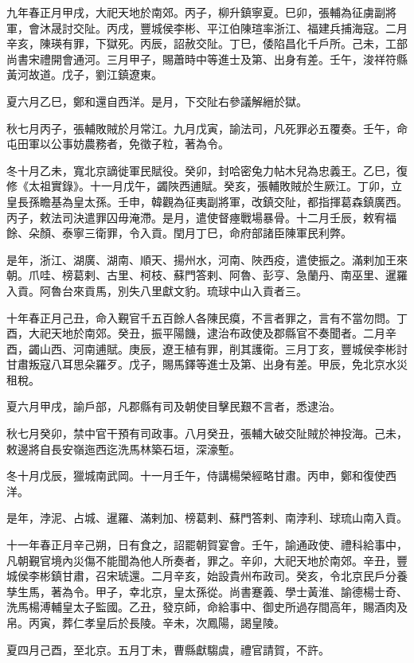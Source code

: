 \begin{pinyinscope}
九年春正月甲戌，大祀天地於南郊。丙子，柳升鎮寧夏。巳卯，張輔為征虜副將軍，會沐晟討交阯。丙戌，豐城侯李彬、平江伯陳瑄率浙江、福建兵捕海寇。二月辛亥，陳瑛有罪，下獄死。丙辰，詔赦交阯。丁巳，倭陷昌化千戶所。己未，工部尚書宋禮開會通河。三月甲子，賜蕭時中等進士及第、出身有差。壬午，浚祥符縣黃河故道。戊子，劉江鎮遼東。

夏六月乙巳，鄭和還自西洋。是月，下交阯右參議解縉於獄。

秋七月丙子，張輔敗賊於月常江。九月戊寅，諭法司，凡死罪必五覆奏。壬午，命屯田軍以公事妨農務者，免徵子粒，著為令。

冬十月乙未，寬北京謫徙軍民賦役。癸卯，封哈密兔力帖木兒為忠義王。乙巳，復修《太祖實錄》。十一月戊午，蠲陜西逋賦。癸亥，張輔敗賊於生厥江。丁卯，立皇長孫瞻基為皇太孫。壬申，韓觀為征夷副將軍，改鎮交阯，都指揮葛森鎮廣西。丙子，敕法司決遣罪囚毋淹滯。是月，遣使督瘞戰場暴骨。十二月壬辰，敕宥福餘、朵顏、泰寧三衛罪，令入貢。閏月丁巳，命府部諸臣陳軍民利弊。

是年，浙江、湖廣、湖南、順天、揚州水，河南、陜西疫，遣使振之。滿剌加王來朝。爪哇、榜葛剌、古里、柯枝、蘇門答剌、阿魯、彭亨、急蘭丹、南巫里、暹羅入貢。阿魯台來貢馬，別失八里獻文豹。琉球中山入貢者三。

十年春正月己丑，命入覲官千五百餘人各陳民瘼，不言者罪之，言有不當勿問。丁酉，大祀天地於南郊。癸丑，振平陽饑，逮治布政使及郡縣官不奏聞者。二月辛酉，蠲山西、河南逋賦。庚辰，遼王植有罪，削其護衛。三月丁亥，豐城侯李彬討甘肅叛寇八耳思朵羅歹。戊子，賜馬鐸等進士及第、出身有差。甲辰，免北京水災租稅。

夏六月甲戌，諭戶部，凡郡縣有司及朝使目擊民艱不言者，悉逮治。

秋七月癸卯，禁中官干預有司政事。八月癸丑，張輔大破交阯賊於神投海。己未，敕邊將自長安嶺迤西迄洗馬林築石垣，深濠塹。

冬十月戊辰，獵城南武岡。十一月壬午，侍講楊榮經略甘肅。丙申，鄭和復使西洋。

是年，浡泥、占城、暹羅、滿剌加、榜葛剌、蘇門答剌、南浡利、球琉山南入貢。

十一年春正月辛己朔，日有食之，詔罷朝賀宴會。壬午，諭通政使、禮科給事中，凡朝覲官境內災傷不能聞為他人所奏者，罪之。辛卯，大祀天地於南郊。辛丑，豐城侯李彬鎮甘肅，召宋琥還。二月辛亥，始設貴州布政司。癸亥，令北京民戶分養孳生馬，著為令。甲子，幸北京，皇太孫從。尚書蹇義、學士黃淮、諭德楊士奇、洗馬楊溥輔皇太子監國。乙丑，發京師，命給事中、御史所過存間高年，賜酒肉及帛。丙寅，葬仁孝皇后於長陵。辛未，次鳳陽，謁皇陵。

夏四月己酉，至北京。五月丁未，曹縣獻騶虞，禮官請賀，不許。


\end{pinyinscope}
